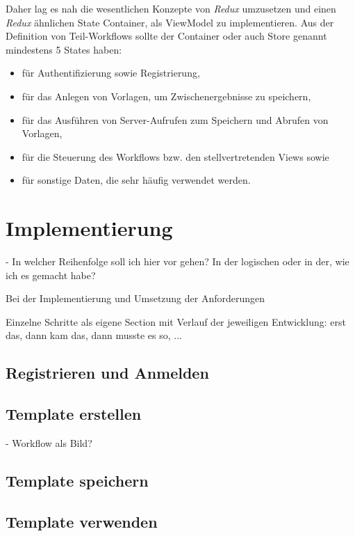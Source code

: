\documentclass[nomenclature, oneside, 150]{HSMW-Thesis}
\begin{document}
		Daher lag es nah die wesentlichen Konzepte von \textit{Redux} umzusetzen und einen \textit{Redux} ähnlichen State Container, als ViewModel zu implementieren. Aus der Definition von Teil-Workflows sollte der Container oder auch Store genannt mindestens 5 States haben: 
		\begin{itemize}
			\item für Authentifizierung sowie Registrierung,
			\item für das Anlegen von Vorlagen, um Zwischenergebnisse zu speichern,
			\item für das Ausführen von Server-Aufrufen zum Speichern und Abrufen von Vorlagen, 
			\item für die Steuerung des Workflows bzw. den stellvertretenden Views sowie
			\item für sonstige Daten, die sehr häufig verwendet werden.
		\end{itemize}
		
		

	\section{Implementierung}
		
		- In welcher Reihenfolge soll ich hier vor gehen? In der logischen oder in der, wie ich es gemacht habe?
		
		Bei der Implementierung und Umsetzung der Anforderungen 
		
		
		
		
		Einzelne Schritte als eigene Section mit Verlauf der jeweiligen Entwicklung: erst das, dann kam das, dann musste es so, ...
		
		\subsection{Registrieren und Anmelden}
			
		\subsection{Template erstellen}
			- Workflow als Bild?
		
		\subsection{Template speichern}
		
		\subsection{Template verwenden}
		
\end{document}
